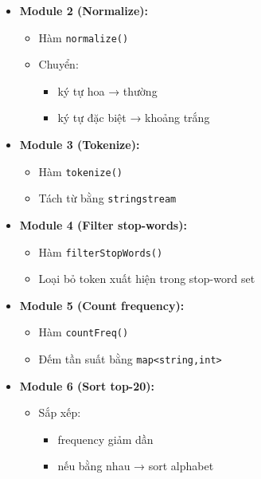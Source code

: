 \begin{itemize}
\begin{itemize}
        \item \textbf{Module 2 (Normalize):}

        \begin{itemize}
            \item Hàm \texttt{normalize()}
            \item Chuyển:
            \begin{itemize}
                \item ký tự hoa → thường
                \item ký tự đặc biệt → khoảng trắng
            \end{itemize}
        \end{itemize}

        \item \textbf{Module 3 (Tokenize):}

        \begin{itemize}
            \item Hàm \texttt{tokenize()}
            \item Tách từ bằng \texttt{stringstream}
        \end{itemize}

        \item \textbf{Module 4 (Filter stop-words):}

        \begin{itemize}
            \item Hàm \texttt{filterStopWords()}
            \item Loại bỏ token xuất hiện trong stop-word set
        \end{itemize}

        \item \textbf{Module 5 (Count frequency):}

        \begin{itemize}
            \item Hàm \texttt{countFreq()}
            \item Đếm tần suất bằng \texttt{map<string,int>}
        \end{itemize}

        \item \textbf{Module 6 (Sort top-20):}

        \begin{itemize}
            \item Sắp xếp:
            \begin{itemize}
                \item frequency giảm dần
                \item nếu bằng nhau → sort alphabet
            \end{itemize}
        \end{itemize}


\end{itemize}
\end{itemize}
